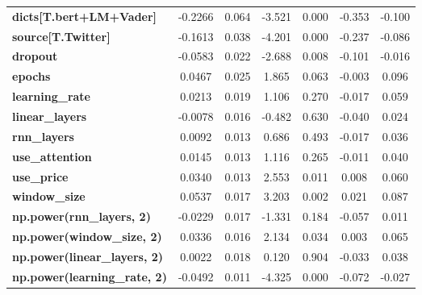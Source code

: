 \begin{center}
\begin{tabular}{lcccccc}
\textbf{dicts[T.bert+LM+Vader]}      &      -0.2266  &        0.064     &    -3.521  &         0.000        &       -0.353    &       -0.100     \\
\textbf{source[T.Twitter]}           &      -0.1613  &        0.038     &    -4.201  &         0.000        &       -0.237    &       -0.086     \\
\textbf{dropout}                     &      -0.0583  &        0.022     &    -2.688  &         0.008        &       -0.101    &       -0.016     \\
\textbf{epochs}                      &       0.0467  &        0.025     &     1.865  &         0.063        &       -0.003    &        0.096     \\
\textbf{learning\_rate}              &       0.0213  &        0.019     &     1.106  &         0.270        &       -0.017    &        0.059     \\
\textbf{linear\_layers}              &      -0.0078  &        0.016     &    -0.482  &         0.630        &       -0.040    &        0.024     \\
\textbf{rnn\_layers}                 &       0.0092  &        0.013     &     0.686  &         0.493        &       -0.017    &        0.036     \\
\textbf{use\_attention}              &       0.0145  &        0.013     &     1.116  &         0.265        &       -0.011    &        0.040     \\
\textbf{use\_price}                  &       0.0340  &        0.013     &     2.553  &         0.011        &        0.008    &        0.060     \\
\textbf{window\_size}                &       0.0537  &        0.017     &     3.203  &         0.002        &        0.021    &        0.087     \\
\textbf{np.power(rnn\_layers, 2)}    &      -0.0229  &        0.017     &    -1.331  &         0.184        &       -0.057    &        0.011     \\
\textbf{np.power(window\_size, 2)}   &       0.0336  &        0.016     &     2.134  &         0.034        &        0.003    &        0.065     \\
\textbf{np.power(linear\_layers, 2)} &       0.0022  &        0.018     &     0.120  &         0.904        &       -0.033    &        0.038     \\
\textbf{np.power(learning\_rate, 2)} &      -0.0492  &        0.011     &    -4.325  &         0.000        &       -0.072    &       -0.027     \\

\end{tabular}
\end{center}
